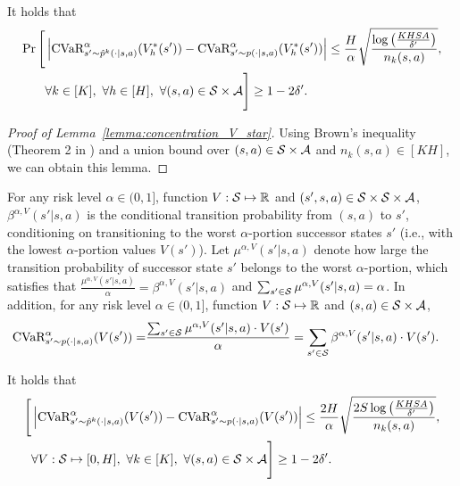 \begin{lemma} \label{lemma:concentration_V_star}
	It holds that
	\begin{align*}
		\Pr \Bigg[ & \left| \textup{CVaR}^{\alpha}_{s' \sim \hat{p}^k(\cdot|s,a)}(V^{*}_h(s')) - \textup{CVaR}^{\alpha}_{s' \sim p(\cdot|s,a)}(V^{*}_h(s')) \right| \leq \frac{H}{\alpha}\sqrt{\frac{ \log \left( \frac{KHSA}{\delta'} \right) }{n_k(s,a)}} ,
		\\ & \forall k \in [K],\ \forall h \in [H],\ \forall (s,a) \in \mathcal{S} \times \mathcal{A} \Bigg] \geq 1-2\delta' .
	\end{align*}
\end{lemma}
\begin{proof}[Proof of Lemma~\ref{lemma:concentration_V_star}]
	Using Brown's inequality~\citep{brown2007large} (Theorem 2 in \citep{thomas2019concentration}) and a union bound over $(s,a) \in \mathcal{S} \times \mathcal{A}$ and $n_k(s,a) \in [KH]$, we can obtain this lemma.
\end{proof}


For any risk level $\alpha \in (0,1]$, function $V: \mathcal{S} \mapsto \mathbb{R}$ and $(s',s,a) \in \mathcal{S} \times \mathcal{S} \times \mathcal{A}$, $\beta^{\alpha,V}(s'|s,a)$ is the conditional transition probability from $(s,a)$ to $s'$, conditioning on transitioning to the worst $\alpha$-portion successor states $s'$ (i.e., with the lowest $\alpha$-portion values $V(s')$). 
Let $\mu^{\alpha,V}(s'|s,a)$ denote how large the transition probability of successor state $s'$ belongs to the worst $\alpha$-portion, which satisfies that  $\frac{\mu^{\alpha,V}(s'|s,a)}{\alpha} = \beta^{\alpha,V}(s'|s,a)$ and $\sum_{s' \in \mathcal{S}} \mu^{\alpha,V}(s'|s,a)=\alpha$.
In addition, for any risk level $\alpha \in (0,1]$, function $V: \mathcal{S} \mapsto \mathbb{R}$ and $(s,a) \in \mathcal{S} \times \mathcal{A}$,
\begin{align*}
	\textup{CVaR}^{\alpha}_{s' \sim p(\cdot|s,a)}(V(s')) = & \frac{\sum_{s' \in \mathcal{S}} \mu^{\alpha,V}(s'|s,a) \cdot V(s')}{\alpha} = \sum_{s' \in \mathcal{S}} \beta^{\alpha,V}(s'|s,a) \cdot V(s') .
\end{align*}

\begin{lemma} \label{lemma:concentration_any_V} 
	It holds that
	\begin{align*}
		\Bigg[ &\abr{\cvar^{\alpha}_{s' \sim \hat{p}^k(\cdot|s,a)}(V(s')) - \cvar^{\alpha}_{s' \sim p(\cdot|s,a)}(V(s'))} \leq \frac{2H}{\alpha}\sqrt{\frac{2S\log \sbr{\frac{KHSA}{\delta'}}}{n_k(s,a)}} ,
		\\ & \forall V: \cS \mapsto [0,H],\ \forall k \in [K],\ \forall (s,a) \in \cS \times \cA \Bigg] \geq 1-2\delta' .
	\end{align*}
\end{lemma}

